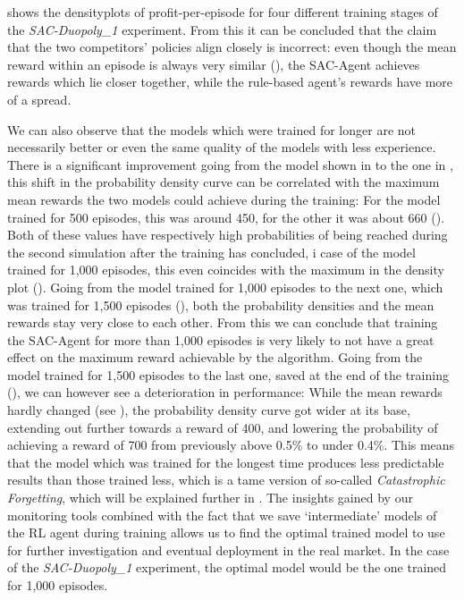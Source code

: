  shows the densityplots of profit-per-episode for four different training stages of the \emph{SAC-Duopoly\_1} experiment. From this it can be concluded that the claim that the two competitors' policies align closely is incorrect: even though the mean reward within an episode is always very similar (), the SAC-Agent achieves rewards which lie closer together, while the rule-based agent's rewards have more of a spread.

We can also observe that the models which were trained for longer are not necessarily better or even the same quality of the models with less experience. There is a significant improvement going from the model shown in  to the one in , this shift in the probability density curve can be correlated with the maximum mean rewards the two models could achieve during the training: For the model trained for 500 episodes, this was around 450, for the other it was about 660 (). Both of these values have respectively high probabilities of being reached during the second simulation after the training has concluded, i case of the model trained for 1,000 episodes, this even coincides with the maximum in the density plot (). Going from the model trained for 1,000 episodes to the next one, which was trained for 1,500 episodes (), both the probability densities and the mean rewards stay very close to each other. From this we can conclude that training the SAC-Agent for more than 1,000 episodes is very likely to not have a great effect on the maximum reward achievable by the algorithm. Going from the model trained for 1,500 episodes to the last one, saved at the end of the training (), we can however see a deterioration in performance: While the mean rewards hardly changed (see ), the probability density curve got wider at its base, extending out further towards a reward of 400, and lowering the probability of achieving a reward of 700 from previously above 0.5\% to under 0.4\%. This means that the model which was trained for the longest time produces less predictable results than those trained less, which is a tame version of so-called \emph{Catastrophic Forgetting}, which will be explained further in . The insights gained by our monitoring tools combined with the fact that we save `intermediate' models of the RL agent during training allows us to find the optimal trained model to use for further investigation and eventual deployment in the real market. In the case of the \emph{SAC-Duopoly\_1} experiment, the optimal model would be the one trained for 1,000 episodes.

